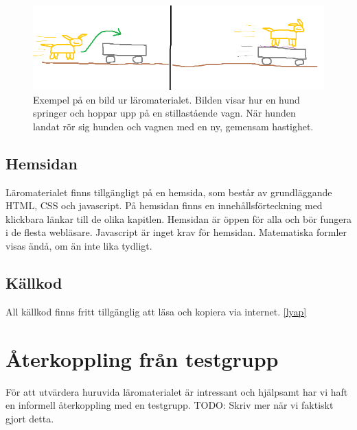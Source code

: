 \begin{binge}
\begin{figure}
  \includegraphics[width=\linewidth]{figure/smakprov_bild_laromaterial.png}
  \caption{Exempel på en bild ur läromaterialet. Bilden visar hur en hund springer och hoppar upp på en stillastående vagn. När hunden landat rör sig hunden och vagnen med en ny, gemensam hastighet.}
  \label{fig:smakprov_bild_laromaterial}
\end{figure}

\subsection{Hemsidan}

Läromaterialet finns tillgängligt på en hemsida, som består av grundläggande
HTML, CSS och javascript. På hemsidan finns en innehållsförteckning med
klickbara länkar till de olika kapitlen. Hemsidan är öppen för alla och bör
fungera i de flesta webläsare. Javascript är inget krav för hemsidan.
Matematiska formler visas ändå, om än inte lika tydligt.

\subsection{Källkod}

All källkod finns fritt tillgänglig att läsa och kopiera via internet.
\ref{lyap}

\section{Återkoppling från testgrupp}

För att utvärdera huruvida läromaterialet är intressant och hjälpsamt har vi
haft en informell återkoppling med en testgrupp. TODO: Skriv mer när vi
faktiskt gjort detta.

\end{binge}
